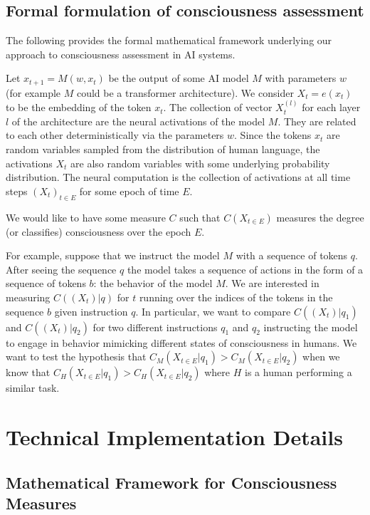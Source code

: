 \documentclass[11pt,a4paper]{article}
\begin{document}
\subsection{Formal formulation of consciousness assessment}

The following provides the formal mathematical framework underlying our approach to consciousness assessment in AI systems.

Let $x_{t+1} = M(w, x_t)$ be the output of some AI model $M$ with parameters $w$ (for example $M$ could be a transformer architecture). We consider $X_t = e(x_t)$ to be the embedding of the token $x_t$. The collection of vector $X^{(l)}_t$ for each layer $l$ of the architecture are the neural activations of the model $M$. They are related to each other deterministically via the parameters $w$. Since the tokens $x_t$ are random variables sampled from the distribution of human language, the activations $X_t$ are also random variables with some underlying probability distribution. The neural computation is the collection of activations at all time steps $(X_t)_{t\in E}$ for some epoch of time $E$.

We would like to have some measure $C$ such that $C(X_{t\in E})$ measures the degree (or classifies) consciousness over the epoch $E$.

For example, suppose that we instruct the model $M$ with a sequence of tokens $q$. After seeing the sequence $q$ the model takes a sequence of actions in the form of a sequence of tokens $b$: the behavior of the model $M$. We are interested in measuring $C((X_t)|q)$ for $t$ running over the indices of the tokens in the sequence $b$ given instruction $q$. In particular, we want to compare $C((X_t)|q_1)$ and $C((X_t)|q_2)$ for two different instructions $q_1$ and $q_2$ instructing the model to engage in behavior mimicking different states of consciousness in humans. We want to test the hypothesis that $C_M(X_{t\in E}|q_1) > C_M(X_{t\in E}|q_2)$ when we know that $C_H(X_{t\in E}|q_1) > C_H(X_{t\in E}|q_2)$ where $H$ is a human performing a similar task.

\section{Technical Implementation Details}

\subsection{Mathematical Framework for Consciousness Measures}
\end{document}

